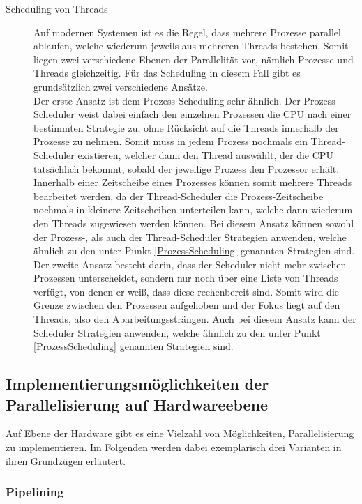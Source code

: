 \begin{description}
					\item[Scheduling von Threads]
					
						Auf modernen Systemen ist es die Regel, dass mehrere Prozesse parallel ablaufen, welche wiederum jeweils aus mehreren Threads bestehen. Somit liegen zwei verschiedene Ebenen der Parallelität vor, nämlich Prozesse und Threads gleichzeitig. Für das Scheduling in diesem Fall gibt es grundsätzlich zwei verschiedene Ansätze.\\
						Der erste Ansatz ist dem Prozess-Scheduling sehr ähnlich. Der Prozess-Scheduler weist dabei einfach den einzelnen Prozessen die CPU nach einer bestimmten Strategie zu, ohne Rücksicht auf die Threads innerhalb der Prozesse zu nehmen. Somit muss in jedem Prozess nochmals ein Thread-Scheduler existieren, welcher dann den Thread auswählt, der die CPU tatsächlich bekommt, sobald der jeweilige Prozess den Prozessor erhält. Innerhalb einer Zeitscheibe eines Prozesses können somit mehrere Threads bearbeitet werden, da der Thread-Scheduler die Prozess-Zeitscheibe nochmals in kleinere Zeitscheiben unterteilen kann, welche dann wiederum den Threads zugewiesen werden können. Bei diesem Ansatz können sowohl der Prozess-, als auch der Thread-Scheduler Strategien anwenden, welche ähnlich zu den unter Punkt \ref{ProzessScheduling} genannten Strategien sind.
						Der zweite Ansatz besteht darin, dass der Scheduler nicht mehr zwischen Prozessen unterscheidet, sondern nur noch über eine Liste von Threads verfügt, von denen er weiß, dass diese rechenbereit sind. Somit wird die Grenze zwischen den Prozessen aufgehoben und der Fokus liegt auf den Threads, also den Abarbeitungssträngen. Auch bei diesem Ansatz kann der Scheduler Strategien anwenden, welche ähnlich zu den unter Punkt \ref{ProzessScheduling} genannten Strategien sind. \cite{ModerneBetriebssysteme}
				\end{description}
			
		\subsection{Implementierungsmöglichkeiten der Parallelisierung auf Hardwareebene}

			Auf Ebene der Hardware gibt es eine Vielzahl von Möglichkeiten, Parallelisierung zu implementieren. Im Folgenden werden dabei exemplarisch drei Varianten in ihren Grundzügen erläutert.
			
			\subsubsection{Pipelining}
			
